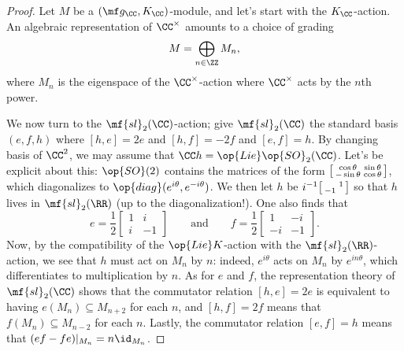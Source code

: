 \documentclass[../notes.tex]{subfiles}
\begin{document}
\begin{proof}
	Let $M$ be a $(\mf g_\CC,K_\CC)$-module, and let's start with the $K_\CC$-action. An algebraic representation of $\CC^\times$ amounts to a choice of grading
	\[M=\bigoplus_{n\in\ZZ}M_n,\]
	where $M_n$ is the eigenspace of the $\CC^\times$-action where $\CC^\times$ acts by the $n$th power.
	
	We now turn to the $\mf{sl}_2(\CC)$-action; give $\mf{sl}_2(\CC)$ the standard basis $(e,f,h)$ where $[h,e]=2e$ and $[h,f]=-2f$ and $[e,f]=h$. By changing basis of $\CC^2$, we may assume that $\CC h=\op{Lie}\op{SO}_2(\CC)$. Let's be explicit about this: $\op{SO}(2)$ contains the matrices of the form $\begin{bsmallmatrix}
		\cos\theta & \sin\theta \\ -\sin\theta & \cos\theta
	\end{bsmallmatrix}$, which diagonalizes to $\op{diag}(e^{i\theta},e^{-i\theta})$. We then let $h$ be $i^{-1}\begin{bsmallmatrix}
		& 1 \\ -1
	\end{bsmallmatrix}$ so that $h$ lives in $\mf{sl}_2(\RR)$ (up to the diagonalization!). One also finds that
	\[e=\frac12\begin{bmatrix}
		1 & i \\ i & -1
	\end{bmatrix}\qquad\text{and}\qquad f=\frac12\begin{bmatrix}
		1 & -i \\ -i & -1
	\end{bmatrix}.\]
	Now, by the compatibility of the $\op{Lie}K$-action with the $\mf{sl}_2(\RR)$-action, we see that $h$ must act on $M_n$ by $n$: indeed, $e^{i\theta}$ acts on $M_n$ by $e^{in\theta}$, which differentiates to multiplication by $n$. As for $e$ and $f$, the representation theory of $\mf{sl}_2(\CC)$ shows that the commutator relation $[h,e]=2e$ is equivalent to having $e(M_n)\subseteq M_{n+2}$ for each $n$, and $[h,f]=2f$ means that $f(M_n)\subseteq M_{n-2}$ for each $n$. Lastly, the commutator relation $[e,f]=h$ means that $(ef-fe)|_{M_n}=n\id_{M_n}$.


\end{proof}
\end{document}
